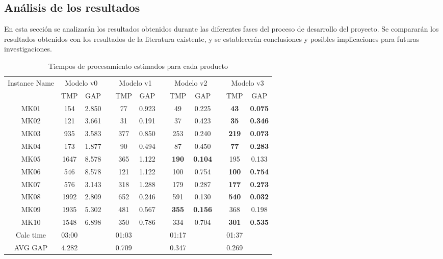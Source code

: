 \subsection{Análisis de los resultados}
En esta sección se analizarán los resultados obtenidos durante las diferentes
fases del proceso de desarrollo del proyecto. Se compararán los resultados
obtenidos con los resultados de la literatura existente, y se establecerán
conclusiones y posibles implicaciones para futuras investigaciones.\medskip

\begin{table}[ht]
    \caption{Tiempos de procesamiento estimados para cada producto} 
    \centering 
    \begin{tabular}{cccccccccccc}  

    \toprule
    \multirow{2}{*}{\parbox[c]{.2\linewidth}{\centering Instance Name}} & 
    \multicolumn{2}{c}{Modelo v0} && 
    \multicolumn{2}{c}{Modelo v1} && 
    \multicolumn{2}{c}{Modelo v2} && 
    \multicolumn{2}{c}{Modelo v3} \\ 

    \cmidrule{2-3} \cmidrule{5-6} \cmidrule{8-9} \cmidrule{11-12}
     & {\centering TMP} & {GAP} && {TMP} & {GAP} && {TMP} & {GAP} && {TMP} & {GAP} \\

    \midrule
    MK01 & 154 & 2.850 && 77 & 0.923 && 49 & 0.225 && \textbf{43} & \textbf{0.075} \\
    MK02 & 121 & 3.661 && 31 & 0.191 && 37 & 0.423 && \textbf{35} & \textbf{0.346} \\
    MK03 & 935 & 3.583 && 377 & 0.850 && 253 & 0.240 && \textbf{219} & \textbf{0.073} \\  
    MK04 & 173 & 1.877 && 90 & 0.494 && 87 & 0.450 && \textbf{77} & \textbf{0.283} \\
    MK05 & 1647 & 8.578 && 365 & 1.122 && \textbf{190} & \textbf{0.104} && 195 & 0.133 \\
    MK06 & 546 & 8.578 && 121 & 1.122 && 100 & 0.754 && \textbf{100} & \textbf{0.754} \\
    MK07 & 576 & 3.143 && 318 & 1.288 && 179 & 0.287 && \textbf{177} & \textbf{0.273} \\
    MK08 & 1992 & 2.809 && 652 & 0.246 && 591 & 0.130 && \textbf{540} & \textbf{0.032} \\
    MK09 & 1935 & 5.302 && 481 & 0.567 && \textbf{355} & \textbf{0.156} && 368 & 0.198 \\
    MK10 & 1548 & 6.898 && 350 & 0.786 && 334 & 0.704 && \textbf{301} & \textbf{0.535} \\
    \hline
        Calc time    & 03:00    &&& 01:03    &&& 01:17    &&& 01:37    \\
        AVG GAP      & 4.282    &&& 0.709    &&& 0.347    &&& 0.269    \\
    \hline
    
    \end{tabular}
\end{table}

